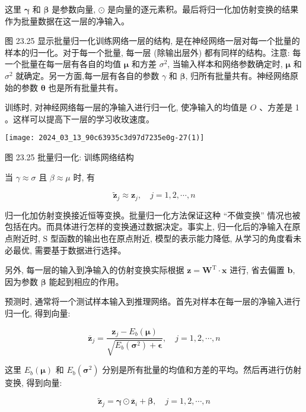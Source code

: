 \documentclass[10pt]{article}
\begin{document}
\begin{CJK*}{UTF8}{bsmi}
这里 $\boldsymbol{\gamma}$ 和 $\boldsymbol{\beta}$ 是参数向量, $\odot$ 是向量的逐元素积。最后将归一化加仿射变换的结果作为批量数据在这一层的净输入。

图 23.25 显示批量归一化训练网络一层的结构, 是在神经网络一层对每一个批量的样本的归一化。对于每一个批量, 每一层 (除输出层外) 都有同样的结构。注意: 每一个批量在每一层有各自的均值 $\boldsymbol{\mu}$ 和方差 $\sigma^{2}$, 当输入样本和网络参数确定时, $\boldsymbol{\mu}$ 和 $\sigma^{2}$ 就确定。另一方面,每一层有各自的参数 $\gamma$ 和 $\boldsymbol{\beta}$, 归所有批量共有。神经网络原始的参数 $\boldsymbol{\theta}$ 也是所有批量共有。

训练时, 对神经网络每一层的净输入进行归一化, 使净输入的均值是 $O$ 、方差是 1 。这样可以提高下一层的学习收玫速度。

\begin{center}
\texttt{[image: 2024\_03\_13\_90c63935c3d97d7235e0g-27(1)]}
\end{center}

图 23.25 批量归一化: 训练网络结构

当 $\gamma \approx \sigma$ 且 $\beta \approx \mu$ 时, 有

$$
\tilde{\boldsymbol{z}}_{j} \approx \boldsymbol{z}_{j}, \quad j=1,2, \cdots, n
$$

归一化加仿射变换接近恒等变换。批量归一化方法保证这种 “不做变换” 情况也被包括在内。而具体进行怎样的变换通过数据决定。事实上, 归一化后的净输入在原点附近时, $\mathrm{S}$ 型函数的输出也在原点附近, 模型的表示能力降低, 从学习的角度看未必最优, 需要基于数据进行选择。

另外, 每一层的输入到净输入的仿射变换实际根据 $\boldsymbol{z}=\boldsymbol{W}^{\mathrm{T}} \cdot \boldsymbol{x}$ 进行, 省去偏置 $\boldsymbol{b}$, 因为参数 $\boldsymbol{\beta}$ 能起到相应的作用。

预测时, 通常将一个测试样本输入到推理网络。首先对样本在每一层的净输入进行归一化, 得到向量:


\begin{equation*}
\overline{\boldsymbol{z}}_{j}=\frac{\boldsymbol{z}_{j}-E_{b}(\boldsymbol{\mu})}{\sqrt{E_{b}\left(\boldsymbol{\sigma}^{2}\right)+\boldsymbol{\epsilon}}}, \quad j=1,2, \cdots, n \tag{23.63}
\end{equation*}


这里 $E_{b}(\boldsymbol{\mu})$ 和 $E_{b}\left(\boldsymbol{\sigma}^{2}\right)$ 分别是所有批量的均值和方差的平均。然后再进行仿射变换, 得到向量:


\begin{equation*}
\tilde{\boldsymbol{z}}_{j}=\boldsymbol{\gamma} \odot \overline{\boldsymbol{z}}_{i}+\boldsymbol{\beta}, \quad j=1,2, \cdots, n \tag{23.64}
\end{equation*}



\end{CJK*}
\end{document}
